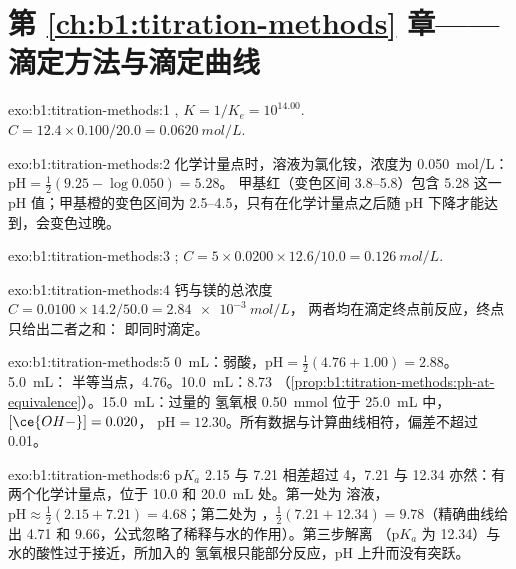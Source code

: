\section*{第 \ref{ch:b1:titration-methods} 章——滴定方法与滴定曲线}

\begin{solution}{exo:b1:titration-methods:1}
, $K = 1/K_e = 10^{14.00}$. $C = 12.4 \times
0.100/20.0 = \qty{0.0620}{mol/L}$.
\end{solution}

\begin{solution}{exo:b1:titration-methods:2}
化学计量点时，溶液为氯化铵，浓度为
\qty{0.050}{mol/L}：$\mathrm{pH} = \frac12(9.25 - \log 0.050) = 5.28$。
甲基红（变色区间 3.8--5.8）包含 5.28 这一 pH 值；甲基橙的变色区间为 2.5--4.5，只有在化学计量点之后随 pH 下降才能达到，会变色过晚。
\end{solution}

\begin{solution}{exo:b1:titration-methods:3}
;
$C = 5 \times 0.0200 \times 12.6/10.0 = \qty{0.126}{mol/L}$.
\end{solution}

\begin{solution}{exo:b1:titration-methods:4}
钙与镁的总浓度 $C = 0.0100 \times 14.2/50.0 = \qty{2.84e-3}{mol/L}$，
两者均在滴定终点前反应，终点只给出二者之和：
即同时滴定。
\end{solution}

\begin{solution}{exo:b1:titration-methods:5}
0~mL：弱酸，$\mathrm{pH} = \frac12(4.76 + 1.00) = 2.88$。5.0~mL：
半等当点，4.76。10.0~mL：8.73
（\cref{prop:b1:titration-methods:ph-at-equivalence}）。15.0~mL：过量的
氢氧根 \qty{0.50}{mmol} 位于 \qty{25.0}{mL} 中，$[\ce{OH-}] = 0.020$，
$\mathrm{pH} = 12.30$。所有数据与计算曲线相符，偏差不超过 0.01。
\end{solution}

\begin{solution}{exo:b1:titration-methods:6}
$\mathrm{p}K_a$ 2.15 与 7.21 相差超过 4，7.21 与
12.34 亦然：有两个化学计量点，位于 10.0 和 \qty{20.0}{mL} 处。第一处为
 溶液，$\mathrm{pH} \approx \frac12(2.15 + 7.21) = 4.68$；第二处为
，$\frac12(7.21 + 12.34) = 9.78$（精确曲线给出 4.71 和
9.66，公式忽略了稀释与水的作用）。第三步解离
（$\mathrm{p}K_a$ 为 12.34）与水的酸性过于接近，所加入的
氢氧根只能部分反应，pH 上升而没有突跃。
\end{solution}

